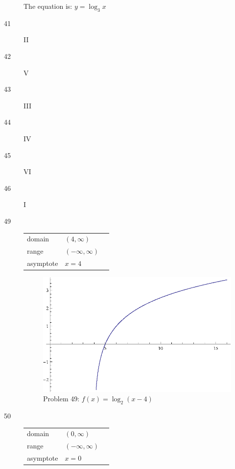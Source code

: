 \documentclass{exam}
\begin{document}
\begin{description}
      The equation is: $y = \log_3 x$

    \item[41] II
    \item[42] V
    \item[43] III
    \item[44] IV
    \item[45] VI
    \item[46] I

    \pagebreak

    \item[49]
      \begin{tabular}[H]{lll}
        \toprule
        domain    & $(4, \infty)$ \\
        range     & $(-\infty, \infty)$ \\
        asymptote & $x = 4$ \\
        \bottomrule
      \end{tabular}

      \begin{figure}[H]
        \centering
        \includegraphics[scale = 0.9]{problem49.eps}
        \caption{Problem 49: $f(x) = \log_2(x - 4)$}
      \end{figure}

    \item[50]
      \begin{tabular}[H]{lll}
        \toprule
        domain    & $(0, \infty)$ \\
        range     & $(-\infty, \infty)$ \\
        asymptote & $x = 0$ \\
        \bottomrule
      \end{tabular}


\end{description}
\end{document}
